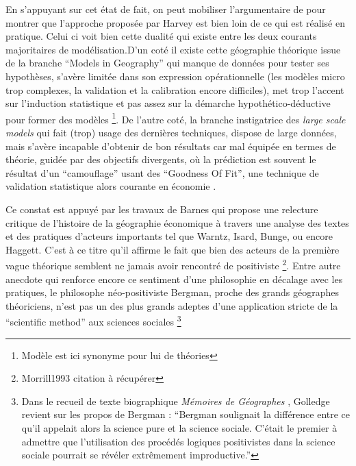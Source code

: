 
En s'appuyant sur cet état de fait, on peut mobiliser l'argumentaire de \textcite{Wilson1972} pour montrer que l'approche proposée par Harvey est bien loin de ce qui est réalisé en pratique. Celui ci voit bien cette dualité qui existe entre les deux courants majoritaires de modélisation.D'un coté il existe cette géographie théorique issue de la branche \foreignquote{english}{Models in Geography} qui manque de données pour tester ses hypothèses, s'avère limitée dans son expression opérationnelle (les modèles micro trop complexes, la validation et la calibration encore difficiles), met trop l'accent sur l'induction statistique et pas assez sur la démarche hypothético-déductive pour former des modèles \footnote{Modèle est ici synonyme pour lui de théories}. De l'autre coté, la branche instigatrice des \textit{large scale models} qui fait (trop) usage des dernières techniques, dispose de large données, mais s'avère incapable d'obtenir de bon résultats car mal équipée en termes de théorie, guidée par des objectifs divergents, où la prédiction est souvent le résultat d'un \enquote{camouflage} usant des \foreignquote{english}{Goodness Of Fit}, une technique de validation statistique alors courante en économie \autocite[10]{Batty1994}.



Ce constat est appuyé par les travaux de Barnes qui propose une relecture critique de l'histoire de la géographie économique \autocite[122]{Barnes1996} à travers une analyse des textes et des pratiques d'acteurs importants tel que Warntz, Isard, Bunge, ou encore Haggett. C'est à ce titre qu'il affirme \autocite{Barnes2001a} le fait que bien des acteurs de la première vague théorique semblent ne jamais avoir rencontré de positiviste \footnote{Morrill1993 citation à récupérer}. Entre autre anecdote qui renforce encore ce sentiment d'une philosophie en décalage avec les pratiques, le philosophe néo-positiviste Bergman, proche des grands géographes théoriciens, n'est pas un des plus grands adeptes d'une application stricte de la \foreignquote{english}{scientific method} aux sciences sociales \footnote{Dans le recueil de texte biographique \textit{Mémoires de Géographes} \textcite[96]{Bailly2000}, Golledge revient sur les propos de Bergman : \enquote{Bergman soulignait la différence entre ce qu'il appelait alors la science pure et la science sociale. C'était le premier à admettre que l'utilisation des procédés logiques positivistes dans la science sociale pourrait se révéler extrêmement improductive.} }

